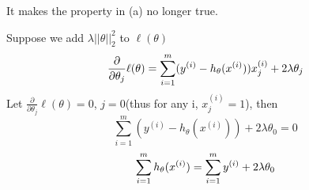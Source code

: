 \begin{answer}
    
    It makes the property in (a) no longer true.
    
    Suppose we add $\lambda ||\theta||_2^2$ to $\ell(\theta)$
    $$
    \frac{\partial}{\partial \theta_j} \ell(\theta) = \sum_{i=1}^m (y^{(i)} - h_\theta(x^{(i)}))x^{(i)}_j + 2\lambda \theta_j\\
$$  
Let $\frac{\partial}{\partial \theta_j} \ell(\theta) = 0$, $j = 0$(thus for any i, $x^{(i)}_j = 1$), then
$$
    \sum_{i = 1}^m (y^{(i)} - h_\theta(x^{(i)})) + 2\lambda\theta_0 = 0 
    $$
    $$
    \sum_{i = 1}^m h_\theta(x^{(i)}) = \sum_{i = 1}^m y^{(i)} + 2\lambda\theta_0 \\
$$   
\end{answer}
